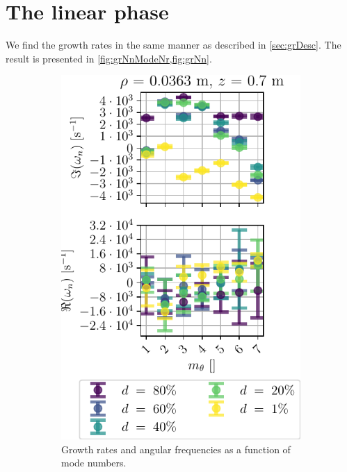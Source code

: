 \section{The linear phase}
%
We find the growth rates in the same manner as described in \cref{sec:grDesc}.
The result is presented in \cref{fig:grNnModeNr,fig:grNn}.
%
\begin{figure}[htbp]
    \centering
    \begin{subfigure}[h]{0.45\textwidth}
        \centering
        \includegraphics{fig/results/neutral/growthRatesNnScan}
        \caption{Growth rates and angular frequencies as a function of mode numbers.}
        \label{fig:grNn}
    \end{subfigure}%
    \hfill
    \begin{subfigure}[h]{0.45\textwidth}
       \centering

\end{subfigure}
\end{figure}
